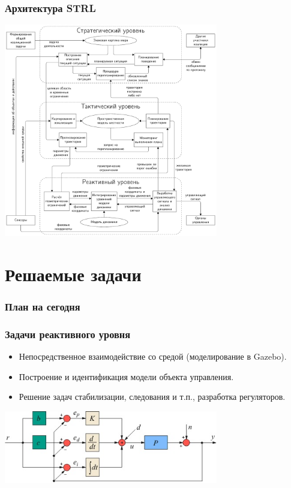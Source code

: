 \documentclass[12pt]{beamer}
\begin{document}
\begin{frame}
\frametitle{Архитектура STRL}
\begin{center}
	\includegraphics[width=0.7\textwidth]{agent-schemas/ru/architecture}
	
\end{center}
\end{frame}

\section{Решаемые задачи}
\begin{frame}
\frametitle{План на сегодня}
\tableofcontents[currentsection] 
\end{frame}

\begin{frame}
\frametitle{Задачи реактивного уровня}
\begin{itemize}
	\item Непосредственное взаимодействие со средой (моделирование в Gazebo).
	\item Построение и идентификация модели объекта управления.
	\item Решение задач стабилизации, следования и т.п., разработка регуляторов.
\end{itemize}
\par\bigskip
\begin{center}
	\includegraphics[width=0.7\textwidth]{pid.jpg}
	
\end{center}
\end{frame}
\end{document}
